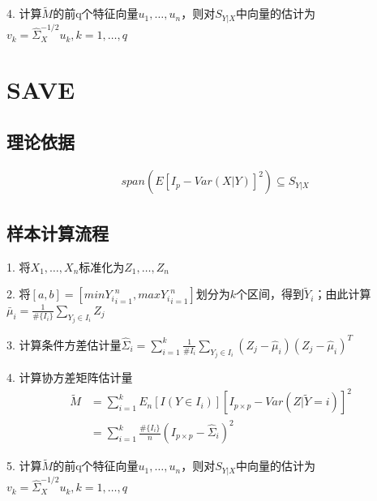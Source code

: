 \documentclass[lang=cn,11pt]{elegantpaper}
\begin{document}
    4. 计算$\widetilde{M}$的前q个特征向量$u_1,\dots,u_n$，则对$S_{Y|X}$中向量的估计为$v_k=\hat{\Sigma}_{X}^{-1/2}u_k,k=1,\dots,q$

    \section{SAVE}
    \subsection{理论依据}
    \begin{align*}
        &span(E[I_p-Var(X|Y)]^2) \subseteq S_{Y|X}
    \end{align*}
    \subsection{样本计算流程}
    1. 将$X_1,\dots,X_n$标准化为$Z_1,\dots,Z_n$

    2. 将$[a,b]=[min{Y_i}_{i=1}^n,max{Y_i}_{i=1}^n]$划分为$k$个区间，得到$\widetilde{Y}_i$；由此计算$\bar{\mu}_i=\frac{1}{\#\{I_i\}}\sum_{Y_j\in I_i}Z_j$

    3. 计算条件方差估计量$\hat{\Sigma}_i=\sum_{i=1}^k\frac{1}{\#I_i}\sum_{Y_j\in I_i}(Z_j-\hat{\mu}_i)(Z_j-\hat{\mu}_i)^T$

    4. 计算协方差矩阵估计量
    \begin{align*}
        \widetilde{M}&=\sum_{i=1}^kE_n[I(Y\in I_i)] [I_{p\times p}-Var(Z|\widetilde{Y}=i)]^2 \\
        &=\sum_{i=1}^k\frac{\#\{I_i\}}{n}(I_{p\times p}-\hat{\Sigma}_i)^2
    \end{align*}

    5. 计算$\widetilde{M}$的前q个特征向量$u_1,\dots,u_n$，则对$S_{Y|X}$中向量的估计为$v_k=\hat{\Sigma}_{X}^{-1/2}u_k,k=1,\dots,q$
\end{document}
